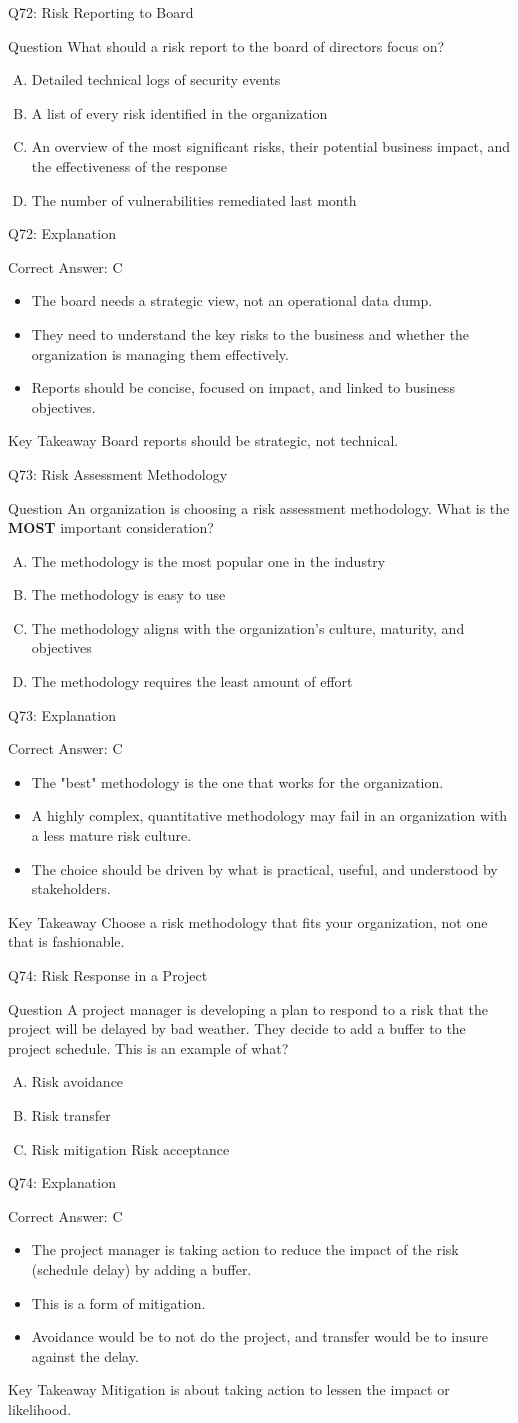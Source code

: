 \documentclass[aspectratio=169]{beamer}
\newcommand{\hq}[7]{%
	\begin{frame}{Q#1: #2}
		\begin{block}{Question}
			#3
		\end{block}
		\begin{enumerate}[(A)]
			#4
		\end{enumerate}
	\end{frame}
	\begin{frame}{Q#1: Explanation}
		\begin{block}{Correct Answer: #5}
			\begin{itemize}
				#6
			\end{itemize}
		\end{block}
		\begin{alertblock}{Key Takeaway}
			#7
		\end{alertblock}
	\end{frame}
}
\begin{document}
{		\hq{72}{Risk Reporting to Board}
		{What should a risk report to the board of directors focus on?}
		{\item Detailed technical logs of security events
			\item A list of every risk identified in the organization
			\item An overview of the most significant risks, their potential business impact, and the effectiveness of the response
			\item The number of vulnerabilities remediated last month}
		{C}
		{\item The board needs a strategic view, not an operational data dump.
			\item They need to understand the key risks to the business and whether the organization is managing them effectively.
			\item Reports should be concise, focused on impact, and linked to business objectives.}
		{Board reports should be strategic, not technical.}
		
		\hq{73}{Risk Assessment Methodology}
		{An organization is choosing a risk assessment methodology. What is the \textbf{MOST} important consideration?}
		{\item The methodology is the most popular one in the industry
			\item The methodology is easy to use
			\item The methodology aligns with the organization's culture, maturity, and objectives
			\item The methodology requires the least amount of effort}
		{C}
		{\item The "best" methodology is the one that works for the organization.
			\item A highly complex, quantitative methodology may fail in an organization with a less mature risk culture.
			\item The choice should be driven by what is practical, useful, and understood by stakeholders.}
		{Choose a risk methodology that fits your organization, not one that is fashionable.}
		
		\hq{74}{Risk Response in a Project}
		{A project manager is developing a plan to respond to a risk that the project will be delayed by bad weather. They decide to add a buffer to the project schedule. This is an example of what?}
		{\item Risk avoidance
			\item Risk transfer
			\item Risk mitigation
			\ditem Risk acceptance}
		{C}
		{\item The project manager is taking action to reduce the impact of the risk (schedule delay) by adding a buffer.
			\item This is a form of mitigation.
			\item Avoidance would be to not do the project, and transfer would be to insure against the delay.}
		{Mitigation is about taking action to lessen the impact or likelihood.}
		
}
\end{document}
